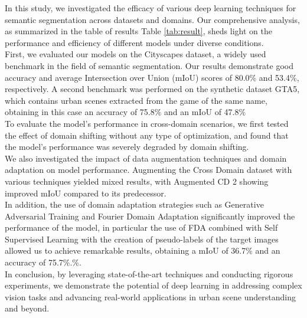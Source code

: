\documentclass[10pt,twocolumn,letterpaper]{article}
\begin{document}
In this study, we investigated the efficacy of various deep learning techniques for semantic segmentation across datasets and domains. Our comprehensive analysis, as summarized in the table of results Table \ref{tab:result}, sheds light on the performance and efficiency of different models under diverse conditions.\\
First, we evaluated our models on the Cityscapes dataset, a widely used benchmark in the field of semantic segmentation. Our results demonstrate good accuracy and average Intersection over Union (mIoU) scores of 80.0\% and 53.4\%, respectively.
A second benchmark was performed on the synthetic dataset GTA5, which contains urban scenes extracted from the game of the same name, obtaining in this case an accuracy of 75.8\% and an mIoU of 47.8\%
\\%
To evaluate the model's performance in cross-domain scenarios, we first tested the effect of domain shifting without any type of optimization, and found that the model's performance was severely degraded by domain shifting.\\
We also investigated the impact of data augmentation techniques and domain adaptation on model performance. Augmenting the Cross Domain dataset with various techniques yielded mixed results, with Augmented CD 2 showing improved mIoU compared to its predecessor. \\
In addition, the use of domain adaptation strategies such as Generative Adversarial Training and Fourier Domain Adaptation significantly improved the performance of the model, in particular the use of FDA combined with Self Supervised Learning with the creation of pseudo-labels of the target images allowed us to achieve remarkable results, obtaining a mIoU of 36.7\% and an accuracy of 75.7\%.\%. \\
In conclusion, by leveraging state-of-the-art techniques and conducting rigorous experiments, we demonstrate the potential of deep learning in addressing complex vision tasks and advancing real-world applications in urban scene understanding and beyond.



{\small



}
\end{document}
